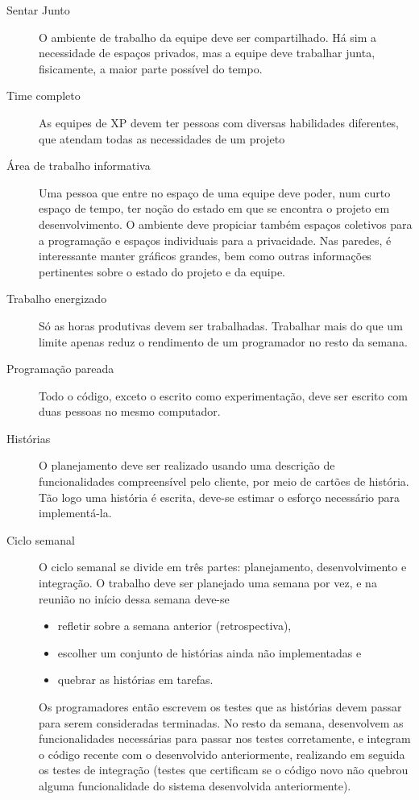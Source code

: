     \begin{description}
      \item[Sentar Junto]
      O ambiente de trabalho da equipe deve ser compartilhado. Há sim a necessidade de espaços privados, mas a equipe deve trabalhar junta, fisicamente, a maior parte possível do tempo.
      \item[Time completo]
      As equipes de XP devem ter pessoas com diversas habilidades diferentes, que atendam todas as necessidades de um projeto
      \item[Área de trabalho informativa]
      Uma pessoa que entre no espaço de uma equipe deve poder, num curto espaço de tempo, ter noção do estado em que se encontra o projeto em desenvolvimento. O ambiente deve propiciar também espaços coletivos para a programação e espaços individuais para a privacidade. Nas paredes, é interessante manter gráficos grandes, bem como outras informações pertinentes sobre o estado do projeto e da equipe.
      \item[Trabalho energizado]
      Só as horas produtivas devem ser trabalhadas. Trabalhar mais do que um limite apenas reduz o rendimento de um programador no resto da semana.
      \item[Programação pareada]
      Todo o código, exceto o escrito como experimentação, deve ser escrito com duas pessoas no mesmo computador.
      \item[Histórias]
      O planejamento deve ser realizado usando uma descrição de funcionalidades compreensível pelo cliente, por meio de cartões de história. Tão logo uma história é escrita, deve-se estimar o esforço necessário para implementá-la.
      \item[Ciclo semanal]
      O ciclo semanal se divide em três partes: planejamento, desenvolvimento e integração. O trabalho deve ser planejado uma semana por vez, e na reunião no início dessa semana deve-se 
        \begin{itemize}
         \item refletir sobre a semana anterior (retrospectiva),
         \item escolher um conjunto de histórias ainda não implementadas e
         \item quebrar as histórias em tarefas.
        \end{itemize}
      Os programadores então escrevem os testes que as histórias devem passar para serem consideradas terminadas. No resto da semana, desenvolvem as funcionalidades necessárias para passar nos testes corretamente, e integram o código recente com o desenvolvido anteriormente, realizando em seguida os testes de integração (testes que certificam se o código novo não quebrou alguma funcionalidade do sistema desenvolvida anteriormente).


\end{description}
